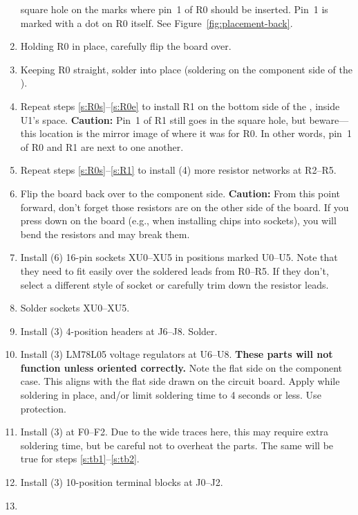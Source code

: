 \documentclass[letterpaper,twoside,onecolumn,openright,final]{memoir}
\begin{document}
\begin{enumerate}
	square hole on the  marks where pin~1 of R0 should be inserted.  Pin~1 is marked
	with a dot on R0 itself. See Figure~\ref{fig:placement-back}.
\item	Holding R0 in place, carefully flip the board over.
\item\label{s:R0e}
	Keeping R0 straight, solder into place (soldering on the component side of the ).
\item\label{s:R1}
	Repeat steps \ref{s:R0s}--\ref{s:R0e} to install R1 on the bottom side of the ,
	inside U1's space.  {\bfseries Caution:} Pin~1 of R1 still goes in the square hole, but 
	beware---this location is the mirror image of where it was for R0.  In other words, pin~1
	of R0 and R1 are next to one another.
\item	Repeat steps \ref{s:R0s}--\ref{s:R1} to install (4) more resistor networks at R2--R5.
\item	Flip the board back over to the component side.  {\bfseries Caution:} From this point 
	forward, don't forget those resistors are on the other side of the board.  If you press down
	on the board (e.g., when installing chips into sockets), you will bend the resistors and may
	break them.
\item	Install (6) 16-pin  sockets XU0--XU5 in positions marked U0--U5.  
	Note that they need to fit easily
	over the soldered leads from R0--R5.  If they don't, select a different style of socket or
	carefully trim down the resistor leads.
\item	Solder sockets XU0--XU5.
\item	Install (3) 4-position  headers at J6--J8.  Solder.
\item	Install (3) LM78L05 voltage regulators at U6--U8.  
	{\bfseries These parts will not function unless oriented correctly.}  Note the flat side on
	the component case.  This aligns with the flat side drawn on the circuit board.
	Apply  while soldering in
	place, and/or limit soldering time to 4 seconds or less.  Use  protection.
\item	Install (3)  at F0--F2.  Due to the wide  traces here, this may require
	extra soldering time, but be careful not to overheat the parts.  The same will be true for
	steps \ref{s:tb1}--\ref{s:tb2}.
\item\label{s:tb1}
	Install (3) 10-position terminal blocks at J0--J2.  
\item\label{s:tb2}

\end{enumerate}
\end{document}
